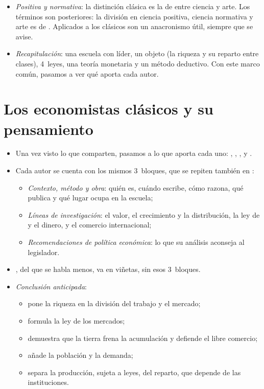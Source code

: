 \documentclass[11pt]{article}
\begin{document}
\begin{itemize}
\begin{itemize}
  \item {}: el materialismo histórico; las leyes económicas no son naturales, sino propias de cada modo de producción (\ref{sec:marx-contexto}).
  \end{itemize}
\item \emph{Positiva y normativa}: la distinción clásica es la de  entre ciencia y arte. Los términos son posteriores: la división en ciencia positiva, ciencia normativa y arte es de \textcite{KeynesJN1891Scope} . Aplicados a los clásicos son un anacronismo útil, siempre que se avise.
\item \emph{Recapitulación}: una escuela con líder, un objeto (la riqueza y su reparto entre clases), 4~leyes, una teoría monetaria y un método deductivo. Con este marco común, pasamos a ver qué aporta cada autor.
\end{itemize}

\section{Los economistas clásicos y su pensamiento}\label{sec:autores-clasicos}

\begin{itemize}
\item Una vez visto lo que comparten, pasamos a lo que aporta cada uno: , , ,  y .
\item Cada autor se cuenta con los mismos 3~bloques, que se repiten también en :
  \begin{itemize}
  \item \emph{Contexto, método y obra}: quién es, cuándo escribe, cómo razona, qué publica y qué lugar ocupa en la escuela;
  \item \emph{Líneas de investigación}: el valor, el crecimiento y la distribución, la ley de  y el dinero, y el comercio internacional;
  \item \emph{Recomendaciones de política económica}: lo que su análisis aconseja al legislador.
  \end{itemize}
\item {}, del que se habla menos, va en viñetas, sin esos 3~bloques.
\item \emph{Conclusión anticipada}:
  \begin{itemize}
  \item {} pone la riqueza en la división del trabajo y el mercado;
  \item {} formula la ley de los mercados;
  \item {} demuestra que la tierra frena la acumulación y defiende el libre comercio;
  \item {} añade la población y la demanda;
  \item {} separa la producción, sujeta a leyes, del reparto, que depende de las instituciones.
  \end{itemize}
\end{itemize}
\end{document}
